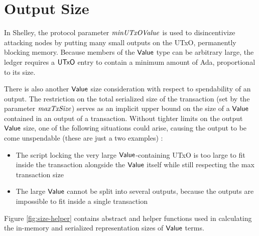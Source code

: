 \section{Output Size}
\label{sec:value-size}

In Shelley, the protocol parameter $\mathit{minUTxOValue}$ is used to
disincentivize attacking nodes by putting many small outputs on the
UTxO, permanently blocking memory. Because members of the $\mathsf{Value}$
type can be arbitrary large, the ledger requires a $\mathsf{UTxO}$ entry to
contain a minimum amount of Ada, proportional to its size.

There is also another $\mathsf{Value}$ size consideration with respect to spendability
of an output. The restriction on the total serialized size of the transaction (set
by the parameter $\mathit{maxTxSize}$) serves as an implicit upper bound on the
size of a $\mathsf{Value}$ contained in an output of a transaction. Without tighter
limits on the output $\mathsf{Value}$ size, one of the following situations could arise,
causing the output to be come unspendable (these are just a two examples) :

\begin{itemize}
  \item The script locking the very large $\mathsf{Value}$-containing UTxO is too large
  to fit inside the transaction alongside the $\mathsf{Value}$ itself while still respecting
  the max transaction size
  \item The large $\mathsf{Value}$ cannot be split into several outputs, because the
  outputs are impossible to fit inside a single transaction
\end{itemize}

Figure \ref{fig:size-helper} contains abstract and helper functions
used in calculating the in-memory and serialized representation
sizes of $\mathsf{Value}$ terms.

